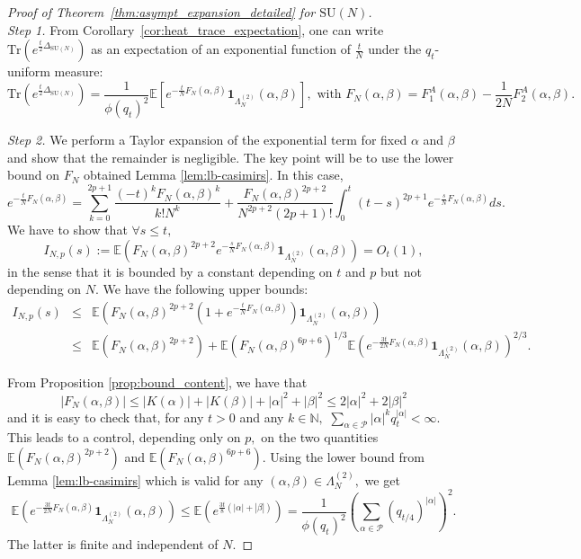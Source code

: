 \documentclass[11pt,a4paper,reqno]{article}
\theoremstyle{definition}
\theoremstyle{remark}
\newcommand\SU{{\mathrm{SU}}}
\newcommand\Tr{\mathrm{Tr}}
\newcommand\Pfr{\mathscr{P}}
\newcommand\E{\mathbb{E}}
\begin{document}
\begin{proof}[Proof of Theorem~\ref{thm:asympt_expansion_detailed} for $\SU(N)$]\mbox{}\\


\emph{Step 1.} From Corollary~\ref{cor:heat_trace_expectation}, one can write  $\Tr(e^{\frac{t}{2}\Delta_{\SU(N)}})$ as an expectation of an exponential function of $\frac t N$ under the $q_t$-uniform measure:
\[
\Tr(e^{\frac{t}{2}\Delta_{\SU(N)}})=\frac{1}{\phi(q_t)^2}\E[e^{- \frac t N F_{N}(\alpha,\beta)}\mathbf{1}_{\Lambda_N^{(2)}}(\alpha,\beta)], \text{ with } F_{N}(\alpha,\beta)=F_1^A(\alpha,\beta)-\frac{1}{2N}F_2^A(\alpha,\beta).
\]

\emph{Step 2.} We perform a Taylor expansion of the exponential term for fixed $\alpha$ and $\beta$  and show that the remainder is negligible.
The key point will be to use the lower bound on $F_N$ obtained  Lemma \ref{lem:lb-casimirs}. In this case,
\[
e^{- \frac t N F_{N}(\alpha,\beta)}=\sum_{k=0}^{2p+1} \frac{(-t)^k F_{N}(\alpha,\beta)^k}{k!N^k}+ \frac{F_N(\alpha, \beta)^{2p+2}}{N^{2p+2}(2p+1)!} \int_0^t (t-s)^{2p+1} e^{-\frac{s}{N} F_{N}(\alpha,\beta)}ds.
\]
We have to show that $\forall s \leq t,$
\[
I_{N,p}(s):=\mathbb E\left(F_{N}(\alpha,\beta)^{2p+2} e^{-\frac{s}{N} F_{N}(\alpha,\beta)}\mathbf{1}_{\Lambda_N^{(2)}}(\alpha,\beta)\right) =O_t(1),
\]
in the sense that it is bounded by a constant depending on $t$ and $p$ but not depending on $N.$ We have the following upper bounds:
\begin{eqnarray*}
 I_{N,p}(s) & \leq & \mathbb E\left(F_{N}(\alpha,\beta)^{2p+2}\left( 1 +  e^{-\frac{t}{N} F_{N}(\alpha,\beta)}\right)\mathbf{1}_{\Lambda_N^{(2)}}(\alpha,\beta)\right) \\
 & \leq& \mathbb E\left(F_{N}(\alpha,\beta)^{2p+2}\right) +  \mathbb E\left(F_{N}(\alpha,\beta)^{6p+6}\right)^{1/3} \mathbb E \left(  e^{-\frac{3t}{2N} F_{N}(\alpha,\beta)}  \mathbf{1}_{\Lambda_N^{(2)}}(\alpha,\beta) \right)^{2/3}.
\end{eqnarray*}


From Proposition \ref{prop:bound_content}, we have that
\[
 |F_{N}(\alpha,\beta)|  \leq |K(\alpha)| + |K(\beta)| + |\alpha|^2 + |\beta|^2   \leq 2 |\alpha|^2 + 2 |\beta|^2
\]
and it is easy to check that, for any $t >0$ and any $k\in\mathbb N,$ $\sum_{\alpha \in \Pfr} |\alpha|^{k} q_t^{|\alpha|} <\infty$. This leads to a control, depending only on $p,$ on the two quantities $\mathbb E\left(F_{N}(\alpha,\beta)^{2p+2}\right)$ and $\mathbb E\left(F_{N}(\alpha,\beta)^{6p+6}\right)$. Using the lower bound from Lemma \ref{lem:lb-casimirs} which is valid for any $(\alpha, \beta) \in \Lambda_N^{(2)},$ we get
\[   \mathbb E \left(  e^{-\frac{3t}{2N} F_{N}(\alpha,\beta)}  \mathbf{1}_{\Lambda_N^{(2)}}(\alpha,\beta) \right) \leq \mathbb E \left(  e^{\frac{3t}{8}(|\alpha|+|\beta|)}   \right) = \frac{1}{\phi(q_t)^2}\left(\sum_{\alpha \in \Pfr} (q_{t/4})^{|\alpha|}\right)^2.\]
The latter is finite and independent of $N.$


\end{proof}
\end{document}
